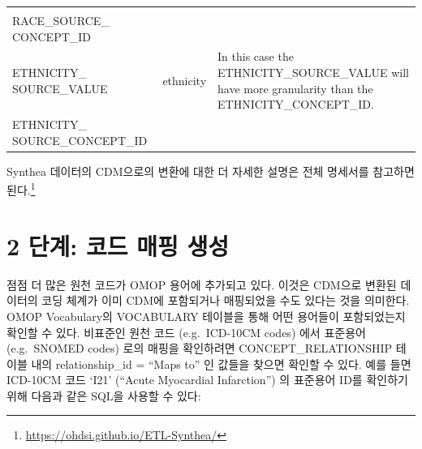 \documentclass[11pt]{book}
\let\rmarkdownfootnote\footnote%
\def\footnote{\protect\rmarkdownfootnote}
\theoremstyle{definition}
\theoremstyle{definition}
\theoremstyle{definition}
\theoremstyle{remark}
\begin{document}
\begin{longtable}[]{@{}lll@{}}
\begin{minipage}[t]{0.50\columnwidth}
\strut
\end{minipage}\tabularnewline
\begin{minipage}[t]{0.28\columnwidth}\raggedright\strut
RACE\_SOURCE\_ CONCEPT\_ID\strut
\end{minipage} & \begin{minipage}[t]{0.13\columnwidth}\raggedright\strut
\strut
\end{minipage} & \begin{minipage}[t]{0.50\columnwidth}\raggedright\strut
\strut
\end{minipage}\tabularnewline
\begin{minipage}[t]{0.28\columnwidth}\raggedright\strut
ETHNICITY\_ SOURCE\_VALUE\strut
\end{minipage} & \begin{minipage}[t]{0.13\columnwidth}\raggedright\strut
ethnicity\strut
\end{minipage} & \begin{minipage}[t]{0.50\columnwidth}\raggedright\strut
In this case the ETHNICITY\_SOURCE\_VALUE will have more granularity
than the ETHNICITY\_CONCEPT\_ID.\strut
\end{minipage}\tabularnewline
\begin{minipage}[t]{0.28\columnwidth}\raggedright\strut
ETHNICITY\_ SOURCE\_CONCEPT\_ID\strut
\end{minipage} & \begin{minipage}[t]{0.13\columnwidth}\raggedright\strut
\strut
\end{minipage} & \begin{minipage}[t]{0.50\columnwidth}\raggedright\strut
\strut
\end{minipage}\tabularnewline
\bottomrule
\end{longtable}

Synthea 데이터의 CDM으로의 변환에 대한 더 자세한 설명은 전체 명세서를
참고하면 된다.\footnote{\url{https://ohdsi.github.io/ETL-Synthea/}}

\section{2 단계: 코드 매핑 생성}\label{---}

점점 더 많은 원천 코드가 OMOP 용어에 추가되고 있다. 이것은 CDM으로
변환된 데이터의 코딩 체계가 이미 CDM에 포함되거나 매핑되었을 수도 있다는
것을 의미한다. OMOP Vocabulary의 VOCABULARY 테이블을 통해 어떤 용어들이
포함되었는지 확인할 수 있다. 비표준인 원천 코드 (e.g.~ICD-10CM codes)
에서 표준용어 (e.g.~SNOMED codes) 로의 매핑을 확인하려면
CONCEPT\_RELATIONSHIP 테이블 내의 relationship\_id = ``Maps to'' 인
값들을 찾으면 확인할 수 있다. 예를 들면 ICD-10CM 코드 `I21' (``Acute
Myocardial Infarction'') 의 표준용어 ID를 확인하기 위해 다음과 같은
SQL을 사용할 수 있다:
\end{document}
